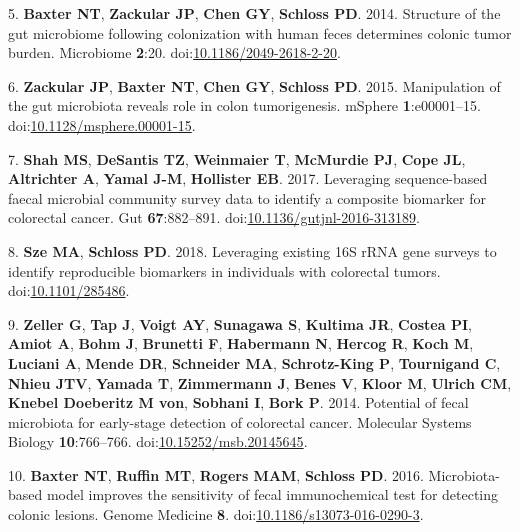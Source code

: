 \documentclass[11pt,]{article}
\begin{document}
\hypertarget{ref-Baxter2014}{}
5. \textbf{Baxter NT}, \textbf{Zackular JP}, \textbf{Chen GY},
\textbf{Schloss PD}. 2014. Structure of the gut microbiome following
colonization with human feces determines colonic tumor burden.
Microbiome \textbf{2}:20.
doi:\href{https://doi.org/10.1186/2049-2618-2-20}{10.1186/2049-2618-2-20}.

\hypertarget{ref-Zackular2015}{}
6. \textbf{Zackular JP}, \textbf{Baxter NT}, \textbf{Chen GY},
\textbf{Schloss PD}. 2015. Manipulation of the gut microbiota reveals
role in colon tumorigenesis. mSphere \textbf{1}:e00001--15.
doi:\href{https://doi.org/10.1128/msphere.00001-15}{10.1128/msphere.00001-15}.

\hypertarget{ref-Shah2017}{}
7. \textbf{Shah MS}, \textbf{DeSantis TZ}, \textbf{Weinmaier T},
\textbf{McMurdie PJ}, \textbf{Cope JL}, \textbf{Altrichter A},
\textbf{Yamal J-M}, \textbf{Hollister EB}. 2017. Leveraging
sequence-based faecal microbial community survey data to identify a
composite biomarker for colorectal cancer. Gut \textbf{67}:882--891.
doi:\href{https://doi.org/10.1136/gutjnl-2016-313189}{10.1136/gutjnl-2016-313189}.

\hypertarget{ref-meta_analysis_crc_Sze2018}{}
8. \textbf{Sze MA}, \textbf{Schloss PD}. 2018. Leveraging existing 16S
rRNA gene surveys to identify reproducible biomarkers in individuals
with colorectal tumors.
doi:\href{https://doi.org/10.1101/285486}{10.1101/285486}.

\hypertarget{ref-Zeller2014}{}
9. \textbf{Zeller G}, \textbf{Tap J}, \textbf{Voigt AY},
\textbf{Sunagawa S}, \textbf{Kultima JR}, \textbf{Costea PI},
\textbf{Amiot A}, \textbf{Bohm J}, \textbf{Brunetti F},
\textbf{Habermann N}, \textbf{Hercog R}, \textbf{Koch M},
\textbf{Luciani A}, \textbf{Mende DR}, \textbf{Schneider MA},
\textbf{Schrotz-King P}, \textbf{Tournigand C}, \textbf{Nhieu JTV},
\textbf{Yamada T}, \textbf{Zimmermann J}, \textbf{Benes V},
\textbf{Kloor M}, \textbf{Ulrich CM}, \textbf{Knebel Doeberitz M von},
\textbf{Sobhani I}, \textbf{Bork P}. 2014. Potential of fecal microbiota
for early-stage detection of colorectal cancer. Molecular Systems
Biology \textbf{10}:766--766.
doi:\href{https://doi.org/10.15252/msb.20145645}{10.15252/msb.20145645}.

\hypertarget{ref-Baxter2016}{}
10. \textbf{Baxter NT}, \textbf{Ruffin MT}, \textbf{Rogers MAM},
\textbf{Schloss PD}. 2016. Microbiota-based model improves the
sensitivity of fecal immunochemical test for detecting colonic lesions.
Genome Medicine \textbf{8}.
doi:\href{https://doi.org/10.1186/s13073-016-0290-3}{10.1186/s13073-016-0290-3}.
\end{document}
